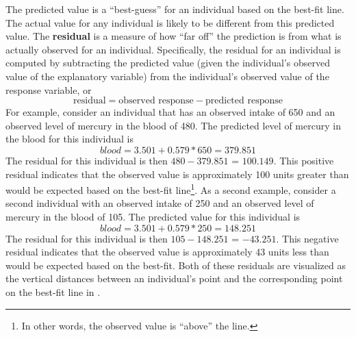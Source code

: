 \documentclass[10pt,openany]{book}\usepackage[]{graphicx}\usepackage[]{color}
\begin{document}

The predicted value is a ``best-guess'' for an individual based on the best-fit line.  The actual value for any individual is likely to be different from this predicted value.  The \textbf{residual} is a measure of how ``far off'' the prediction is from what is actually observed for an individual.  Specifically, the residual for an individual is computed by subtracting the predicted value (given the individual's observed value of the explanatory variable) from the individual's observed value of the response variable, or
  \[ \text{residual}=\text{observed response}-\text{predicted response} \]
For example, consider an individual that has an observed intake of 650 and an observed level of mercury in the blood of 480.  The predicted level of mercury in the blood for this individual is
  \[ blood = 3.501 + 0.579*650 = 379.851 \]
The residual for this individual is then $480-379.851$ = $100.149$.  This positive residual indicates that the observed value is approximately 100 units greater than would be expected based on the best-fit line\footnote{In other words, the observed value is ``above'' the line.}.  As a second example, consider a second individual with an observed intake of 250 and an observed level of mercury in the blood of 105.  The predicted value for this individual is
  \[ blood = 3.501 + 0.579*250 = 148.251 \]
The residual for this individual is then $105-148.251$ = $-43.251$.  This negative residual indicates that the observed value is approximately 43 units less than would be expected based on the best-fit.  Both of these residuals are visualized as the vertical distances between an individual's point and the corresponding point on the best-fit line in .

\end{document}
